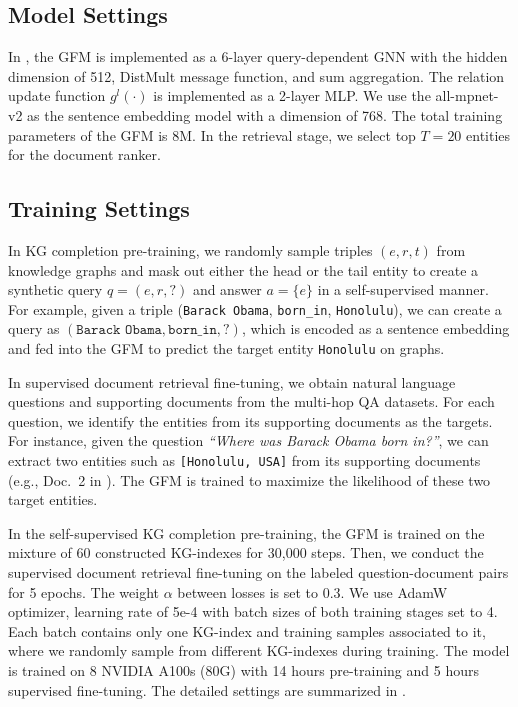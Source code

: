 \subsection{Model Settings}\label{app:model_settings}
In \ourmethod, the GFM is implemented as a 6-layer query-dependent GNN with the hidden dimension of 512, DistMult message function, and sum aggregation. The relation update function $g^{l}(\cdot)$ is implemented as a 2-layer MLP. We use the all-mpnet-v2 as the sentence embedding model with a dimension of 768. The total training parameters of the GFM is 8M. In the retrieval stage, we select top $T=20$ entities for the document ranker.



\subsection{Training Settings}\label{app:training_settings}
In KG completion pre-training, we randomly sample triples $(e, r, t)$ from knowledge graphs and mask out either the head or the tail entity to create a synthetic query $q = (e, r, ?)$ and answer $a = \{e\}$ in a self-supervised manner. For example, given a triple (\texttt{Barack Obama}, \texttt{born\_in}, \texttt{Honolulu}), we can create a query as $(\texttt{Barack Obama}, \texttt{born\_in}, ?)$, which is encoded as a sentence embedding and fed into the GFM to predict the target entity \texttt{Honolulu} on graphs.

In supervised document retrieval fine-tuning, we obtain natural language questions and supporting documents from the multi-hop QA datasets. For each question, we identify the entities from its supporting documents as the targets. For instance, given the question \textit{``Where was Barack Obama born in?''}, we can extract two entities such as \texttt{[Honolulu, USA]} from its supporting documents (e.g., Doc.~2 in ). The GFM is trained to maximize the likelihood of these two target entities.

In the self-supervised KG completion pre-training, the GFM is trained on the mixture of 60 constructed KG-indexes for 30,000 steps. Then, we conduct the supervised document retrieval fine-tuning on the labeled question-document pairs for 5 epochs. The weight $\alpha$ between losses is set to 0.3. We use AdamW optimizer, learning rate of 5e-4 with batch sizes of both training stages set to 4. Each batch contains only one KG-index and training samples associated to it, where we randomly sample from different KG-indexes during training. The model is trained on 8 NVIDIA A100s (80G) with 14 hours pre-training and 5 hours supervised fine-tuning. The detailed settings are summarized in .



